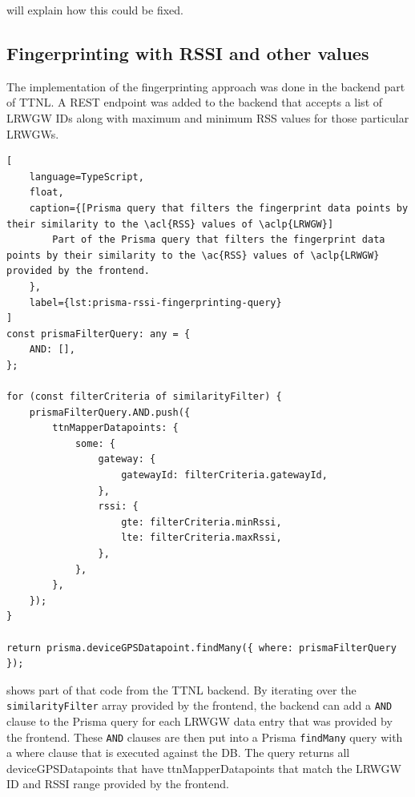  will explain how this could be fixed.

\subsection{Fingerprinting with \acs{RSSI} and other values}\label{sec:fingerprinting-implementation}

The implementation of the fingerprinting approach was done in the backend part of \ac{TTNL}.
A \ac{REST} endpoint was added to the backend that accepts a list of \acl{LRWGW} IDs along with maximum and minimum \ac{RSS} values for those particular \aclp{LRWGW}.

\begin{lstlisting}[
    language=TypeScript,
    float,
    caption={[Prisma query that filters the fingerprint data points by their similarity to the \acl{RSS} values of \aclp{LRWGW}]
        Part of the Prisma query that filters the fingerprint data points by their similarity to the \ac{RSS} values of \aclp{LRWGW} provided by the frontend.
    },
    label={lst:prisma-rssi-fingerprinting-query}
]
const prismaFilterQuery: any = {
    AND: [],
};

for (const filterCriteria of similarityFilter) {
    prismaFilterQuery.AND.push({
        ttnMapperDatapoints: {
            some: {
                gateway: {
                    gatewayId: filterCriteria.gatewayId,
                },
                rssi: {
                    gte: filterCriteria.minRssi,
                    lte: filterCriteria.maxRssi,
                },
            },
        },
    });
}

return prisma.deviceGPSDatapoint.findMany({ where: prismaFilterQuery });
\end{lstlisting}

 shows part of that code from the \ac{TTNL} backend.
By iterating over the \lstinline|similarityFilter| array provided by the frontend, the backend can add a \lstinline|AND| clause to the Prisma query for each \acl{LRWGW} data entry that was provided by the frontend.
These \lstinline|AND| clauses are then put into a Prisma \lstinline|findMany| query with a where clause that is executed against the \ac{DB}.
The query returns all deviceGPSDatapoints that have ttnMapperDatapoints that match the \acl{LRWGW} ID and \ac{RSSI} range provided by the frontend.

